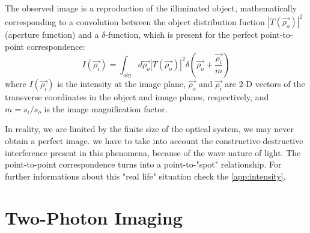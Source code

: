 The observed image is a reproduction of the illiminated object, mathematically
corresponding to a convolution between the object distribution fuction $ |T(\vec{\rho_o})|^2$ (aperture function) and a $\delta$-function, which is present for the perfect
point-to-point correspondence\cite{introquantum}:
\begin{equation}
I(\vec{\rho_i})=\int_{obj} d\vec{\rho_o} |T(\vec{\rho_o})|^2 \delta(\vec{\rho_o}+\frac{\vec{\rho_i}}{m})
\end{equation}
where $I(\vec{\rho_i})$ is the intensity at the image plane, $\vec{\rho_o}$ and $\vec{\rho_i}$ are 2-D vectors of the
transverse coordinates in the object and image planes, respectively, and
$m=s_i/s_o$ is the image magnification factor.

In reality, we are limited by the finite size of the optical system, we may never obtain a perfect image.
we have to take into account the constructive-destructive interference present
in this phenomena, because of the wave nature of light. The point-to-point correspondence turns into a point-to-"spot" relationship.
For further informations about this "real life" situation check the \ref{app:intensity}.



\section{Two-Photon Imaging}

